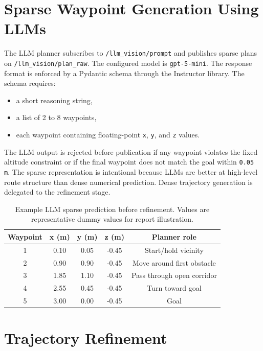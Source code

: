 \documentclass[11pt]{article}
\begin{document}
\section{Sparse Waypoint Generation Using LLMs}

The LLM planner subscribes to \texttt{/llm\_vision/prompt} and publishes sparse plans on \texttt{/llm\_vision/plan\_raw}. The configured model is \texttt{gpt-5-mini}. The response format is enforced by a Pydantic schema through the Instructor library. The schema requires:

\begin{itemize}
  \item a short reasoning string,
  \item a list of 2 to 8 waypoints,
  \item each waypoint containing floating-point \texttt{x}, \texttt{y}, and \texttt{z} values.
\end{itemize}

The LLM output is rejected before publication if any waypoint violates the fixed altitude constraint or if the final waypoint does not match the goal within \texttt{0.05 m}. The sparse representation is intentional because LLMs are better at high-level route structure than dense numerical prediction. Dense trajectory generation is delegated to the refinement stage.

\begin{table}[H]
\centering
\caption{Example LLM sparse prediction before refinement. Values are representative dummy values for report illustration.}
\label{tab:llm-example}
\begin{tabular}{ccccc}
\toprule
Waypoint & x (m) & y (m) & z (m) & Planner role \\
\midrule
1 & 0.10 & 0.05 & -0.45 & Start/hold vicinity \\
2 & 0.90 & 0.90 & -0.45 & Move around first obstacle \\
3 & 1.85 & 1.10 & -0.45 & Pass through open corridor \\
4 & 2.55 & 0.45 & -0.45 & Turn toward goal \\
5 & 3.00 & 0.00 & -0.45 & Goal \\
\bottomrule
\end{tabular}
\end{table}

\section{Trajectory Refinement}
\end{document}
